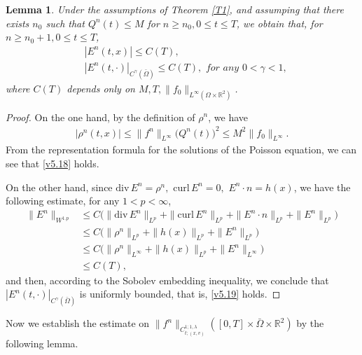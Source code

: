 \documentclass[11pt,reqno]{amsart}%
\newcommand{\dv}{\mathrm{div}\,}
\newcommand{\cl}{\mathrm{curl}\,}
\newtheorem{Lemma}{Lemma}[section]
\theoremstyle{definition}
\theoremstyle{remark}
\begin{document}
\begin{Lemma}\label{L4}
Under the assumptions of Theorem \ref{T1}, and assumping that there exists $n_{0}$ such that  $Q^{n}(t) \leq M$  for $n\geq n_{0}, 0\leq t\leq T$, we obtain that, 
for  $n\geq n_{0}+1, 0\leq t\leq T$, 
\begin{align}
&|E^{n}(t,x)|\leq C(T), \label{v5.18}\\
&|E^{n}(t,\cdot)|_{C^{\gamma}(\bar{\Omega})}\leq C(T),\,\, for\,\, any\,\, 0<\gamma <1, \label{v5.19}
\end{align}
where $C(T)$ depends only on $M,T,\|f_{0}\|_{L^{\infty}(\Omega\times\mathbb{R}^{2})}$.
\end{Lemma}
\begin{proof}
On the one hand, by the definition of $\rho^{n}$, we have
\begin{align}
|\rho^{n}(t,x)|\leq \|f^{n}\|_{L^{\infty}}\big(Q^{n}(t)\big)^{2}\leq M^{2}\|f_{0}\|_{L^{\infty}}. \nonumber
\end{align}
From the representation formula for the solutions of the Poisson equation, we can see that \eqref{v5.18} holds.

On the other hand, since $\dv E^{n}=\rho^{n}, \,\,\cl E^{n}=0,\,\, E^{n} \cdot n =h(x)$, we have the following estimate, for any $1< p< \infty$,
\begin{align}
\|E^{n}\|_{W^{1.p}}&\leq C\Big(\|\dv E^{n}\|_{L^{p}}+\|\cl E^{n}\|_{L^{p}}+\|E^{n}\cdot n\|_{L^{p}}+\|E^{n}\|_{L^{p}}\Big)\nonumber\\
& \leq C\Big(\|\rho^{n}\|_{L^{p}}+\|h(x)\|_{L^{p}}+\|E^{n}\|_{L^{p}}\Big)\nonumber\\
&\leq  C\Big(\|\rho^{n}\|_{L^{\infty}}+\|h(x)\|_{L^{p}}+\|E^{n}\|_{L^{\infty}}\Big)\nonumber\\
&\leq C(T),\nonumber
\end{align}
and then, according to the Sobolev embedding inequality, we conclude that $|E^{n}(t,\cdot)|_{C^{\gamma}(\bar{\Omega})}$ is uniformly bounded, that is, \eqref{v5.19} holds.
\end{proof}

Now we establish the estimate on $\|f^{n}\|_{C^{1;1,\lambda}_{t;(x,v)}}([0,T]\times \bar{\Omega}\times\mathbb{R}^{2})$  by the following lemma.
\end{document}
